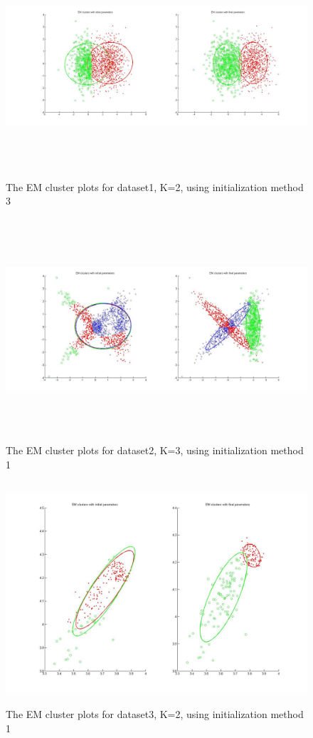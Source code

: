 \documentclass[11pt,psfig]{article}
\begin{document}
\begin{figure}[H]
\centering
\includegraphics[height=3.25in]{dataset1_EMclusterPlots.jpg}
\caption{The EM cluster plots for dataset1, K=2, using initialization method 3}
\end{figure}

\begin{figure}[H]
\centering
\includegraphics[height=3.25in]{dataset2_EMclusterPlots.jpg}
\caption{The EM cluster plots for dataset2, K=3, using initialization method 1}
\end{figure}

\begin{figure}[H]
\centering
\includegraphics[height=3.25in]{dataset3_EMclusterPlots.jpg}
\caption{The EM cluster plots for dataset3, K=2, using initialization method 1}
\end{figure}
\end{document}
